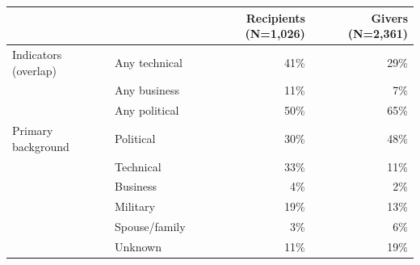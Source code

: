 \begin{tabular}{llrr}
\toprule
 &  & Recipients (N=1,026) & Givers (N=2,361) \\
\midrule
Indicators (overlap) & Any technical & 41\% & 29\% \\
 & Any business & 11\% & 7\% \\
 & Any political & 50\% & 65\% \\
Primary background & Political & 30\% & 48\% \\
 & Technical & 33\% & 11\% \\
 & Business & 4\% & 2\% \\
 & Military & 19\% & 13\% \\
 & Spouse/family & 3\% & 6\% \\
 & Unknown & 11\% & 19\% \\
\bottomrule
\end{tabular}

